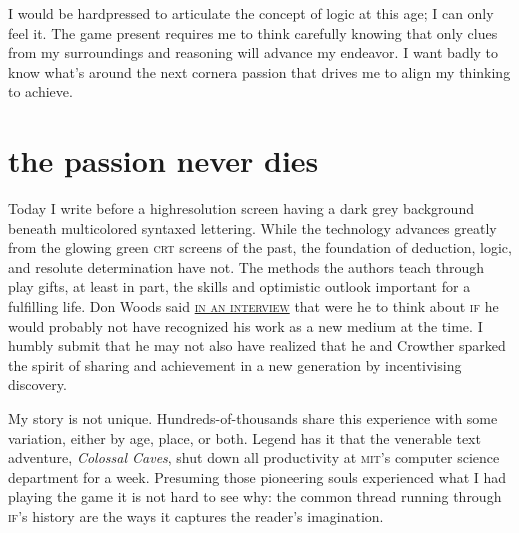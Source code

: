 I would be hard\textendash pressed to articulate the concept of logic at this
age; I can only feel it. The game present requires me to think carefully
knowing that only clues from my surroundings and reasoning will advance my 
endeavor. I want badly to know what's around the next corner\textemdash a
passion that drives me to align my thinking to achieve.

\section{the passion never dies}
\label{sec:passion}
Today I write before a high\textendash resolution screen having a dark grey background beneath
multi\textendash colored syntaxed lettering. While the technology advances
greatly from the glowing green \textsc{crt} screens of the past, the foundation
of deduction, logic, and resolute determination have not. The methods the
\normalmarginpar
{}authors teach through play gifts, at least in part, the skills and optimistic
outlook important for a fulfilling life. Don Woods said
\href{https://youtu.be/LRhbcDzbGSU?t=883}{\textsc{in an interview}} that were he
to think about \textsc{if} he would probably not have recognized his work as
a new medium at the time. I humbly submit that he may not also
 have realized that he and Crowther sparked the spirit of sharing and achievement in a new generation by incentivising discovery.

My story is not unique. Hundreds-of-thousands share this experience with some
variation, either by age, place, or both. Legend has it that the venerable text
adventure, \textit{Colossal
  Caves}, shut down all productivity at \textsc{mit}'s computer science
department for a week. Presuming those pioneering souls experienced what I had
playing the game it is not hard to see why: the common thread running through
\textsc{if}'s history are the ways it captures the reader's imagination.


